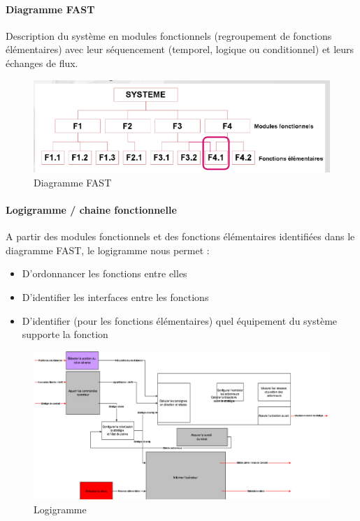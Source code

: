 \paragraph{Diagramme FAST}
Description du système en modules fonctionnels (regroupement de fonctions élémentaires) avec leur séquencement (temporel, logique ou conditionnel) et leurs échanges de flux.
\begin{figure}[!h]
    \begin{center}
        \includegraphics[scale=0.5]{images/fast.png}
        \caption{Diagramme FAST}
    \end{center}
\end{figure}
\paragraph{Logigramme / chaine fonctionnelle}
A partir des modules fonctionnels et des fonctions élémentaires identifiées dans le diagramme FAST, le logigramme nous permet : 
\begin{itemize}
    \item D'ordonnancer les fonctions entre elles 
    \item D'identifier les interfaces entre les fonctions 
    \item D'identifier (pour les fonctions élémentaires) quel équipement du système supporte la fonction
\end{itemize}
\begin{figure}[!h]
    \begin{center}
        \includegraphics[scale=0.5]{images/logigramme.png}
        \caption{Logigramme}
    \end{center}
    \end{figure}
